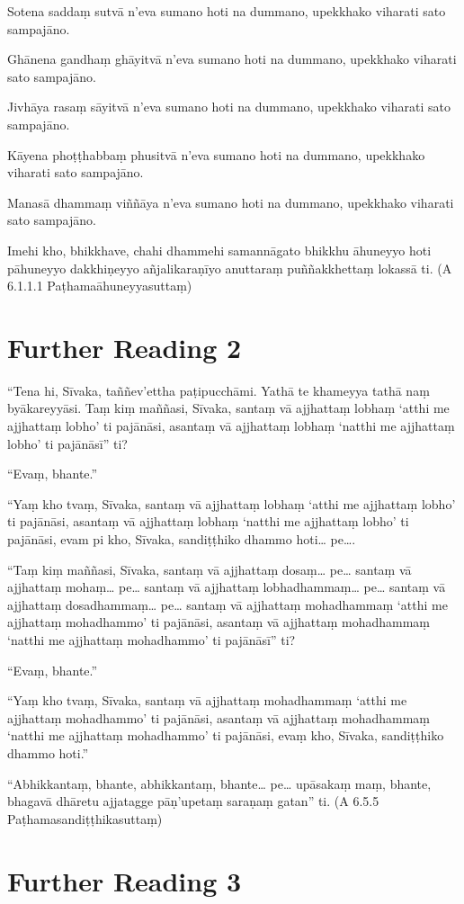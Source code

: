 Sotena saddaṃ sutvā n’eva sumano hoti na dummano, upekkhako viharati sato sampajāno.

Ghānena gandhaṃ ghāyitvā n’eva sumano hoti na dummano, upekkhako viharati sato sampajāno.

Jivhāya rasaṃ sāyitvā n’eva sumano hoti na dummano, upekkhako viharati sato sampajāno.

Kāyena phoṭṭhabbaṃ phusitvā n’eva sumano hoti na dummano, upekkhako viharati sato sampajāno.

Manasā dhammaṃ viññāya n’eva sumano hoti na dummano, upekkhako viharati sato sampajāno.

Imehi kho, bhikkhave, chahi dhammehi samannāgato bhikkhu āhuneyyo hoti pāhuneyyo dakkhiṇeyyo añjalikaraṇīyo anuttaraṃ puññakkhettaṃ lokassā ti. \hfill(A 6.1.1.1 Paṭhamaāhuneyyasuttaṃ)

\section*{Further Reading 2}

“Tena hi, Sīvaka, taññev’ettha paṭipucchāmi. Yathā te khameyya tathā naṃ byākareyyāsi. Taṃ kiṃ maññasi, Sīvaka, santaṃ vā ajjhattaṃ lobhaṃ ‘atthi me ajjhattaṃ lobho’ ti pajānāsi, asantaṃ vā ajjhattaṃ lobhaṃ ‘natthi me ajjhattaṃ lobho’ ti pajānāsī” ti?

“Evaṃ, bhante.”

“Yaṃ kho tvaṃ, Sīvaka, santaṃ vā ajjhattaṃ lobhaṃ ‘atthi me ajjhattaṃ lobho’ ti pajānāsi, asantaṃ vā ajjhattaṃ lobhaṃ ‘natthi me ajjhattaṃ lobho’ ti pajānāsi, evam pi kho, Sīvaka, sandiṭṭhiko dhammo hoti… pe….

“Taṃ kiṃ maññasi, Sīvaka, santaṃ vā ajjhattaṃ dosaṃ… pe… santaṃ vā ajjhattaṃ mohaṃ… pe… santaṃ vā ajjhattaṃ lobhadhammaṃ… pe… santaṃ vā ajjhattaṃ dosadhammaṃ… pe… santaṃ vā ajjhattaṃ mohadhammaṃ ‘atthi me ajjhattaṃ mohadhammo’ ti pajānāsi, asantaṃ vā ajjhattaṃ mohadhammaṃ ‘natthi me ajjhattaṃ mohadhammo’ ti pajānāsī” ti?

“Evaṃ, bhante.”

“Yaṃ kho tvaṃ, Sīvaka, santaṃ vā ajjhattaṃ mohadhammaṃ ‘atthi me ajjhattaṃ mohadhammo’ ti pajānāsi, asantaṃ vā ajjhattaṃ mohadhammaṃ ‘natthi me ajjhattaṃ mohadhammo’ ti pajānāsi, evaṃ kho, Sīvaka, sandiṭṭhiko dhammo hoti.”

“Abhikkantaṃ, bhante, abhikkantaṃ, bhante… pe… upāsakaṃ maṃ, bhante, bhagavā dhāretu ajjatagge pāṇ’upetaṃ saraṇaṃ gatan” ti. \hfill(A 6.5.5 Paṭhamasandiṭṭhikasuttaṃ)

\section*{Further Reading 3}

